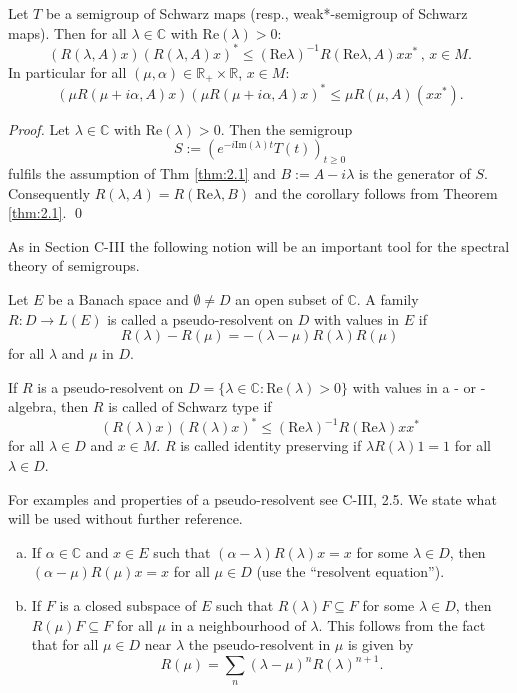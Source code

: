 \begin{corollary}\label{cor:2.3}
Let $ T $ be a semigroup of Schwarz maps (resp., weak*-semigroup of Schwarz maps).
Then for all $ \lambda \in \mathbb{C} $ with $ \text{Re}(\lambda) > 0 $:
\[
(R(\lambda,A)x)(R(\lambda,A)x)^* \leq (\text{Re}\lambda)^{-1} R(\text{Re}\lambda,A)xx^* \, , \, x \in M .
\]
In particular for all $ (\mu,\alpha) \in \mathbb{R}_+ \times \mathbb{R} $, $ x \in M $:
\[
(\mu R(\mu+i\alpha,A)x)(\mu R(\mu+i\alpha,A)x)^* \leq \mu R(\mu,A)(xx^*).
\]
\end{corollary}

\begin{proof}
Let $ \lambda \in \mathbb{C} $ with $ \text{Re}(\lambda) > 0 $.
Then the semigroup
\[
S := (e^{-i\text{Im}(\lambda)t}T(t))_{t\geq0}
\]
fulfils the assumption of Thm \ref{thm:2.1} and $ B := A - i\lambda $ is the generator of $ S $.
Consequently $ R(\lambda,A) = R(\text{Re}\lambda,B) $ and the corollary follows from Theorem \ref{thm:2.1}.
\qed
\end{proof}

As in Section C-III the following notion will be an important tool for the spectral theory of semigroups.

\begin{definition}\label{def:2.3}
Let $ E $ be a Banach space and $ \emptyset \neq D $ an open subset of $ \mathbb{C} $.
A family $ R: D \to L(E) $ is called a pseudo-resolvent on $ D $ with values in $ E $ if
\[
R(\lambda) - R(\mu) = -(\lambda - \mu)R(\lambda)R(\mu)
\]
for all $ \lambda $ and $ \mu $ in $ D $.
\end{definition}


If $ R $ is a pseudo-resolvent on $ D = \{\lambda \in \mathbb{C} : \text{Re}(\lambda) > 0\} $ with values in a \CA- or \WA-algebra, then $ R $ is called of Schwarz type if
\[
(R(\lambda)x)(R(\lambda)x)^* \leq (\text{Re}\lambda)^{-1} R(\text{Re}\lambda)xx^*
\]
for all $ \lambda \in D $ and $ x \in M $.
$ R $ is called identity preserving if $ \lambda R(\lambda)1 = 1 $ for all $ \lambda \in D $.

For examples and properties of a pseudo-resolvent see C-III, 2.5.
We state what will be used without further reference.

\begin{enumerate}[(a)]
\item 
If $ \alpha \in \mathbb{C} $ and $ x \in E $ such that $ (\alpha - \lambda)R(\lambda)x = x $ for some $ \lambda \in D $, then $ (\alpha - \mu)R(\mu)x = x $ for all $ \mu \in D $ (use the \enquote{resolvent equation}).

\item 
If $ F $ is a closed subspace of $ E $ such that $ R(\lambda)F \subseteq F $ for some $ \lambda \in D $, then $ R(\mu)F \subseteq F $ for all $ \mu $ in a neighbourhood of $ \lambda $.
This follows from the fact that for all $ \mu \in D $ near $ \lambda $ the pseudo-resolvent in $ \mu $ is given by
\[
R(\mu) = \sum_n (\lambda - \mu)^n R(\lambda)^{n+1}.
\]
\end{enumerate}

